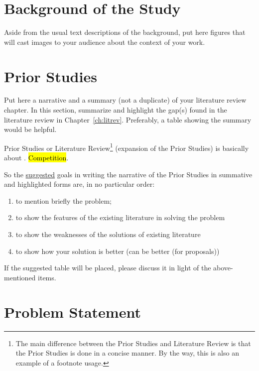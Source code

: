 \section{Background of the Study}

Aside from the usual text descriptions of the background, put here figures that will cast images to your audience about the context of your work.

\graytx{\Blindtext}


\section{Prior Studies}

Put here a narrative and a summary (not a duplicate) of your literature review chapter.  In this section, summarize and highlight the gap(s) found in the literature review in Chapter~\ref{ch:litrev}. Preferably, a table showing the summary would be helpful. 

Prior Studies or Literature Review\footnote{The main difference between the Prior Studies and Literature Review is that the Prior Studies is done in a concise manner.  By the way, this is also an example of a footnote usage.} (expansion of the Prior Studies) is basically about . \hl{Competition}.

So the \underline{suggested} goals in writing the narrative of the Prior Studies in summative and highlighted forms  are, in no particular order:

\begin{enumerate}
	\item to mention briefly the problem; 

	\item to show the features of the existing literature in solving the problem

	\item to show the weaknesses of the solutions of existing literature 

	\item to show how your solution is better (can be better (for proposals))
\end{enumerate}

\noindent If the suggested table will be placed, please discuss it in light of the above-mentioned items. 

 \graytx{\blindtext}


\section{Problem Statement}

